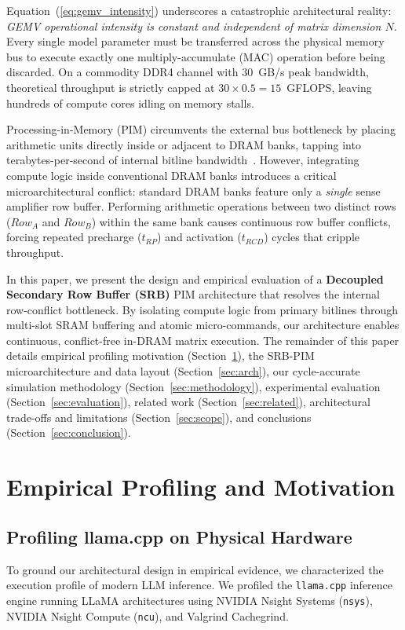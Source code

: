 \documentclass[conference]{IEEEtran}
\begin{document}
Equation~(\ref{eq:gemv_intensity}) underscores a catastrophic architectural reality: \textit{GEMV operational intensity is constant and independent of matrix dimension $N$}. Every single model parameter must be transferred across the physical memory bus to execute exactly one multiply-accumulate (MAC) operation before being discarded. On a commodity DDR4 channel with $30$~GB/s peak bandwidth, theoretical throughput is strictly capped at $30 \times 0.5 = 15$~GFLOPS, leaving hundreds of compute cores idling on memory stalls.

Processing-in-Memory (PIM) circumvents the external bus bottleneck by placing arithmetic units directly inside or adjacent to DRAM banks, tapping into terabytes-per-second of internal bitline bandwidth~\cite{mutlu2020modern, lee2021hardware}. However, integrating compute logic inside conventional DRAM banks introduces a critical microarchitectural conflict: standard DRAM banks feature only a \textit{single} sense amplifier row buffer. Performing arithmetic operations between two distinct rows ($Row_A$ and $Row_B$) within the same bank causes continuous row buffer conflicts, forcing repeated precharge ($t_{RP}$) and activation ($t_{RCD}$) cycles that cripple throughput.

In this paper, we present the design and empirical evaluation of a \textbf{Decoupled Secondary Row Buffer (SRB)} PIM architecture that resolves the internal row-conflict bottleneck. By isolating compute logic from primary bitlines through multi-slot SRAM buffering and atomic micro-commands, our architecture enables continuous, conflict-free in-DRAM matrix execution. The remainder of this paper details empirical profiling motivation (Section~\ref{sec:profiling}), the SRB-PIM microarchitecture and data layout (Section~\ref{sec:arch}), our cycle-accurate simulation methodology (Section~\ref{sec:methodology}), experimental evaluation (Section~\ref{sec:evaluation}), related work (Section~\ref{sec:related}), architectural trade-offs and limitations (Section~\ref{sec:scope}), and conclusions (Section~\ref{sec:conclusion}).

\section{Empirical Profiling and Motivation}
\label{sec:profiling}

\subsection{Profiling llama.cpp on Physical Hardware}
To ground our architectural design in empirical evidence, we characterized the execution profile of modern LLM inference. We profiled the \texttt{llama.cpp} inference engine running LLaMA architectures using NVIDIA Nsight Systems (\texttt{nsys}), NVIDIA Nsight Compute (\texttt{ncu}), and Valgrind Cachegrind.
\end{document}

